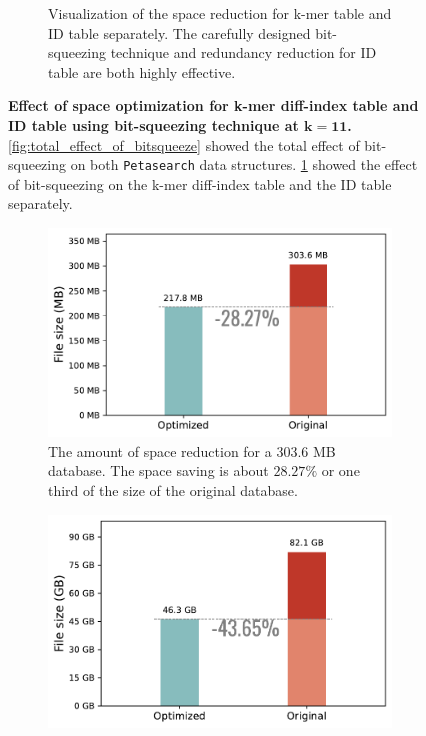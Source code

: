 \begin{figpage}
\begin{figure}
\begin{subfigure}{0.5\textwidth}
      \caption{Visualization of the space reduction for k-mer table and ID table separately.
        The carefully designed bit-squeezing technique and redundancy reduction for ID table are both highly effective.}
      \label{fig:separate_effect_of_bitsqueeze}
    \end{subfigure}
    \caption{\textbf{Effect of space optimization for k-mer diff-index table and ID table using bit-squeezing technique at $\mathbf{k = 11}$.} \cref{fig:total_effect_of_bitsqueeze} showed the total effect of bit-squeezing on both \texttt{Petasearch} data structures.
      \cref{fig:separate_effect_of_bitsqueeze} showed the effect of bit-squeezing on the k-mer diff-index table and the ID table separately.}
    \label{fig:space_opt}
  \end{figure}
  \begin{figure}
    \begin{subfigure}{0.5\textwidth}
      \centering
      \includegraphics[width=\textwidth]{images/seqdbsize_small.pdf}
      \caption{The amount of space reduction for a 303.6 MB database. The space saving is about $28.27\%$ or one third of the size of the original database.}
      \label{fig:seqdbsize_small}
    \end{subfigure}
    \begin{subfigure}{0.5\textwidth}
      \centering
      \includegraphics[width=\textwidth]{images/seqdbsize_large.pdf}

\end{subfigure}
\end{figure}
\end{figpage}
